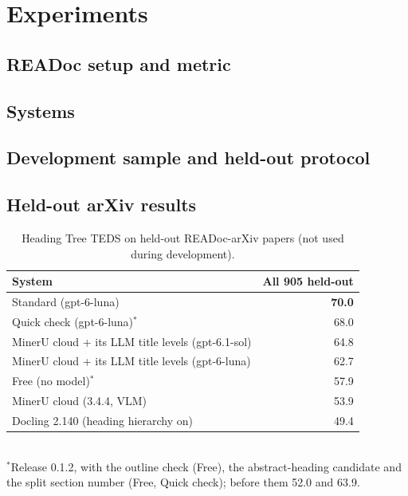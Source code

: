 \section{Experiments}
\label{sec:experiments}
\subsection{READoc setup and metric}\label{sec:readoc-setup}
\subsection{Systems}\label{sec:systems}
\subsection{Development sample and held-out protocol}\label{sec:protocol}
\subsection{Held-out arXiv results}\label{sec:heldout}
\begin{table}[t]\centering
  \caption{Heading Tree TEDS on held-out READoc-arXiv papers (not used during development).}
  \label{tab:heldout}
  \begin{tabular}{lr}\toprule
  System & All 905 held-out \\\midrule
  \sysname{} Standard (gpt-6-luna) & \textbf{70.0} \\
  \sysname{} Quick check (gpt-6-luna)$^{*}$ & 68.0 \\
  MinerU cloud + its LLM title levels (gpt-6.1-sol) & 64.8 \\
  MinerU cloud + its LLM title levels (gpt-6-luna) & 62.7 \\
  \sysname{} Free (no model)$^{*}$ & 57.9 \\
  MinerU cloud (3.4.4, VLM) & 53.9 \\
  Docling 2.140 (heading hierarchy on) & 49.4 \\\bottomrule
  \end{tabular}\\[2pt]
  {\footnotesize $^{*}$Release 0.1.2, with the outline check (Free), the abstract-heading candidate and the split section number (Free, Quick check); before them 52.0 and 63.9.}
\end{table}
